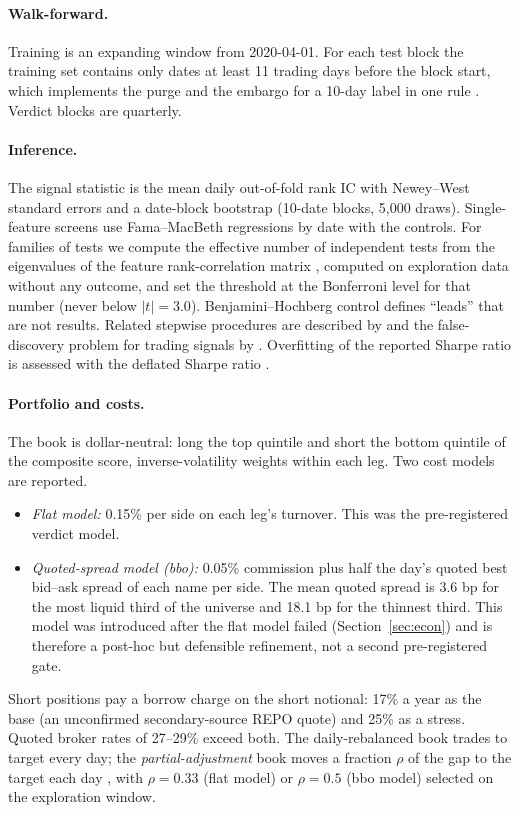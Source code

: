 \documentclass[11pt]{article}
\begin{document}
\paragraph{Walk-forward.} Training is an expanding window from 2020-04-01. For each test block the training set contains only dates at least 11 trading days before the block start, which implements the purge and the embargo for a 10-day label in one rule \citep{lopezdeprado2018advances}. Verdict blocks are quarterly.

\paragraph{Inference.} The signal statistic is the mean daily out-of-fold rank IC with Newey--West standard errors \citep{newey1987simple,andrews1991heteroskedasticity} and a date-block bootstrap (10-date blocks, 5{,}000 draws). Single-feature screens use Fama--MacBeth regressions by date \citep{famamacbeth1973} with the controls. For families of tests we compute the effective number of independent tests from the eigenvalues of the feature rank-correlation matrix \citep{nyholt2004simple}, computed on exploration data without any outcome, and set the threshold at the Bonferroni level for that number (never below $|t|=3.0$). Benjamini--Hochberg control \citep{benjamini1995controlling} defines ``leads'' that are not results. Related stepwise procedures are described by \citet{romano2005stepwise} and the false-discovery problem for trading signals by \citet{harvey2016cross}. Overfitting of the reported Sharpe ratio is assessed with the deflated Sharpe ratio \citep{bailey2014deflated}.

\paragraph{Portfolio and costs.} The book is dollar-neutral: long the top quintile and short the bottom quintile of the composite score, inverse-volatility weights within each leg. Two cost models are reported.
\begin{itemize}
\item \emph{Flat model:} 0.15\% per side on each leg's turnover. This was the pre-registered verdict model.
\item \emph{Quoted-spread model (bbo):} 0.05\% commission plus half the day's quoted best bid--ask spread of each name per side. The mean quoted spread is 3.6 bp for the most liquid third of the universe and 18.1 bp for the thinnest third. This model was introduced after the flat model failed (Section~\ref{sec:econ}) and is therefore a post-hoc but defensible refinement, not a second pre-registered gate.
\end{itemize}
Short positions pay a borrow charge on the short notional: 17\% a year as the base (an unconfirmed secondary-source REPO quote) and 25\% as a stress. Quoted broker rates of 27--29\% exceed both. The daily-rebalanced book trades to target every day; the \emph{partial-adjustment} book moves a fraction $\rho$ of the gap to the target each day \citep{garleanu2013dynamic}, with $\rho=0.33$ (flat model) or $\rho=0.5$ (bbo model) selected on the exploration window.
\end{document}
